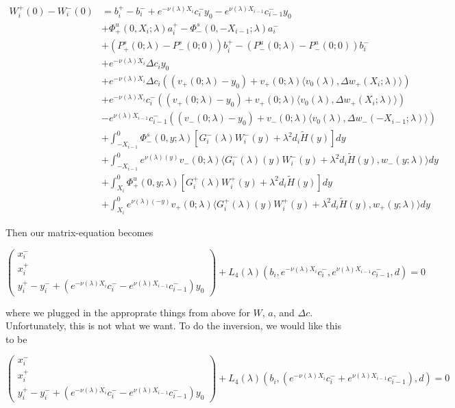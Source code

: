 \documentclass[12pt]{article}
\begin{document}
\begin{enumerate}
\begin{align*}
W_i^+(0) - W_i^-(0) &= b_i^+ - b_i^- + e^{-\nu(\lambda)X_i} c_i^- y_0 - e^{\nu(\lambda)X_{i-1}} c_{i-1}^- y_0\\
&+ \Phi^u_+(0, X_i; \lambda)a_i^+ - \Phi^s_-(0, -X_{i-1}; \lambda)a_i^- \\
&+ (P^s_+(0; \lambda) - P^s_-(0; 0))b_i^+  - (P^u_-(0; \lambda) - P^u_-(0; 0))b_i^- \\
&+ e^{-\nu(\lambda)X_i} \Delta c_i y_0 \\
&+ e^{-\nu(\lambda)X_i} \Delta c_i ( (v_+(0; \lambda) - y_0) + v_+(0; \lambda) \langle  v_0(\lambda), \Delta w_+(X_i; \lambda) \rangle) \\
&+ e^{-\nu(\lambda)X_i} c_i^-( (v_+(0; \lambda) - y_0) + v_+(0; \lambda) \langle  v_0(\lambda), \Delta w_+(X_i; \lambda) \rangle) \\
&- e^{\nu(\lambda)X_{i-1}} c_{i-1}^- ( (v_-(0; \lambda) - y_0) + v_-(0; \lambda) \langle  v_0(\lambda), \Delta w_-(-X_{i-1}; \lambda) \rangle) \\
&+ \int_{-X_{i-1}}^0 \Phi^s_-(0, y; \lambda) [ G_i^-(\lambda)W_i^-(y) + \lambda^2 d_i \tilde{H}(y) ] dy \\
&+ \int_{-X_{i-1}}^0
e^{\nu(\lambda)(y)} v_-(0; \lambda) \langle G_i^-(\lambda)(y)W_i^-(y) + \lambda^2 d_i \tilde{H}(y), w_-(y; \lambda) \rangle dy \\
&+ \int_{X_i}^0 \Phi^u_+(0, y; \lambda) [ G_i^+(\lambda)W_i^+(y) + \lambda^2 d_i \tilde{H}(y) ] dy \\
&+ \int_{X_i}^0 e^{\nu(\lambda)(-y)} v_+(0; \lambda) \langle G_i^+(\lambda)(y)W_i^+(y) + \lambda^2 d_i \tilde{H}(y), w_+(y; \lambda) \rangle dy
\end{align*}

Then our matrix-equation becomes

\[
\begin{pmatrix}x_i^- \\ x_i^+ \\ y_i^+ - y_i^- + (e^{-\nu(\lambda)X_i} c_i^- - e^{\nu(\lambda)X_{i-1}} c_{i-1}^-) y_0 \end{pmatrix} + L_4(\lambda)(b_i, e^{-\nu(\lambda)X_i} c_i^-, e^{\nu(\lambda)X_{i-1}} c_{i-1}^-, d) = 0
\]

where we plugged in the approprate things from above for $W$, $a$, and $\Delta c$. Unfortunately, this is not what we want. To do the inversion, we would like this to be

\[
\begin{pmatrix}x_i^- \\ x_i^+ \\ y_i^+ - y_i^- + (e^{-\nu(\lambda)X_i} c_i^- - e^{\nu(\lambda)X_{i-1}} c_{i-1}^-) y_0 \end{pmatrix} + L_4(\lambda)(b_i, (e^{-\nu(\lambda)X_i} c_i^- + e^{\nu(\lambda)X_{i-1}} c_{i-1}^-), d) = 0
\]


\end{enumerate}
\end{document}
